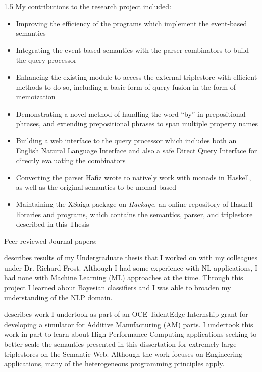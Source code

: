 \documentclass[fleqn, oneside, 12pt]{book}
\theoremstyle{definitionsty}
\newcommand{\uwinonehalfspacelen}{1.5}
\newcommand{\uwindefaultspacelen}{\uwinonehalfspacelen}
\newenvironment{uwindefaultspaceenv}%
{\begin{spacing}{\uwindefaultspacelen}}%
	{\end{spacing}}
\begin{document}
\begin{uwindefaultspaceenv}
My contributions to the research project included:

\begin{itemize}
	\item Improving the efficiency of the programs which implement the event-based semantics
	\item Integrating the event-based semantics with the parser combinators to build the query processor
	\item Enhancing the existing module to access the external triplestore with efficient methods to do so, including a basic form of query fusion in the form of memoization
	\item Demonstrating a novel method of handling the word ``by'' in prepositional phrases, and extending prepositional phrases to span multiple property names
	\item Building a web interface to the query processor which includes both an English Natural Language Interface and also a safe Direct Query Interface for directly evaluating the combinators
	\item Converting the parser Hafiz wrote\cite{frosthafiz2008} to natively work with monads in Haskell, as well as the original semantics\cite{frost2014demonstration} to be monad based
	\item Maintaining the XSaiga package on {\em Hackage}\cite{xsaiga}, an online repository of Haskell libraries and programs, which contains the semantics, parser, and triplestore described in this Thesis
\end{itemize}

Peer reviewed Journal papers:

\cite{peelar2019real} 

\cite{peelar2020webistjournal} 

\cite {donais2013system} describes results of my Undergraduate thesis that I worked on with my colleagues under Dr. Richard Frost.  Although I had some experience with NL applications, I had none with Machine Learning (ML) approaches at the time.  Through this project I learned about Bayesian classifiers and I was able to broaden my understanding of the NLP domain.

\cite {peelar2017windsor,peelar2018toolpath,peelar2019real} describes work I undertook as part of an OCE TalentEdge Internship grant for developing a simulator for Additive Manufacturing (AM) parts.  I undertook this work in part to learn about High Performance Computing applications seeking to better scale the semantics presented in this dissertation for extremely large triplestores on the Semantic Web.  Although the work focuses on Engineering applications, many of the heterogeneous programming principles apply.


\end{uwindefaultspaceenv}
\end{document}
